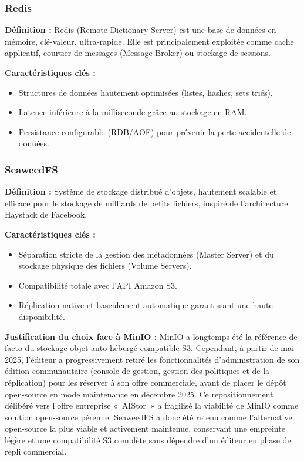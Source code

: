 \documentclass[a4paper,12pt]{article}
\begin{document}
\subsubsection{Redis}
\textbf{Définition :} Redis (Remote Dictionary Server) est une base de données en mémoire, clé-valeur, ultra-rapide. Elle est principalement exploitée comme cache applicatif, courtier de messages (Message Broker) ou stockage de sessions.

\textbf{Caractéristiques clés :}
\begin{itemize}[label=$\bullet$]
    \item Structures de données hautement optimisées (listes, hashes, sets triés).
    \item Latence inférieure à la milliseconde grâce au stockage en RAM.
    \item Persistance configurable (RDB/AOF) pour prévenir la perte accidentelle de données.
\end{itemize}

\subsubsection{SeaweedFS}
\textbf{Définition :} Système de stockage distribué d'objets, hautement scalable et efficace pour le stockage de milliards de petits fichiers, inspiré de l'architecture Haystack de Facebook.

\textbf{Caractéristiques clés :}
\begin{itemize}[label=$\bullet$]
    \item Séparation stricte de la gestion des métadonnées (Master Server) et du stockage physique des fichiers (Volume Servers).
    \item Compatibilité totale avec l'API Amazon S3.
    \item Réplication native et basculement automatique garantissant une haute disponibilité.
\end{itemize}

\textbf{Justification du choix face à MinIO :} MinIO a longtemps été la référence de facto du stockage objet auto-hébergé compatible S3. Cependant, à partir de mai 2025, l'éditeur a progressivement retiré les fonctionnalités d'administration de son édition communautaire (console de gestion, gestion des politiques et de la réplication) pour les réserver à son offre commerciale, avant de placer le dépôt open-source en mode maintenance en décembre 2025. Ce repositionnement délibéré vers l'offre entreprise «~AIStor~» a fragilisé la viabilité de MinIO comme solution open-source pérenne. SeaweedFS a donc été retenu comme l'alternative open-source la plus viable et activement maintenue, conservant une empreinte légère et une compatibilité S3 complète sans dépendre d'un éditeur en phase de repli commercial.
\end{document}
